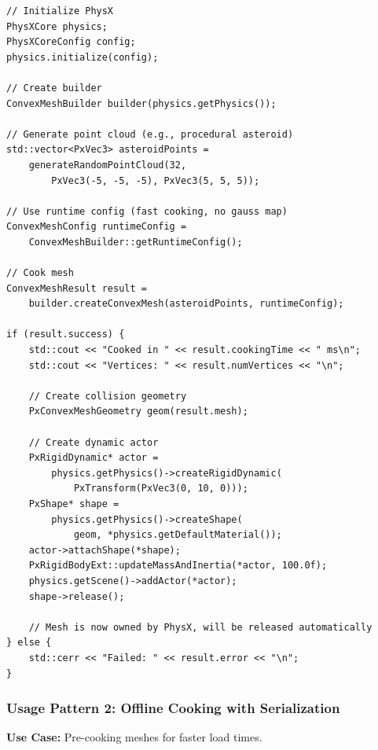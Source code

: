 \begin{lstlisting}[caption={Runtime convex mesh creation}]
// Initialize PhysX
PhysXCore physics;
PhysXCoreConfig config;
physics.initialize(config);

// Create builder
ConvexMeshBuilder builder(physics.getPhysics());

// Generate point cloud (e.g., procedural asteroid)
std::vector<PxVec3> asteroidPoints =
    generateRandomPointCloud(32,
        PxVec3(-5, -5, -5), PxVec3(5, 5, 5));

// Use runtime config (fast cooking, no gauss map)
ConvexMeshConfig runtimeConfig =
    ConvexMeshBuilder::getRuntimeConfig();

// Cook mesh
ConvexMeshResult result =
    builder.createConvexMesh(asteroidPoints, runtimeConfig);

if (result.success) {
    std::cout << "Cooked in " << result.cookingTime << " ms\n";
    std::cout << "Vertices: " << result.numVertices << "\n";

    // Create collision geometry
    PxConvexMeshGeometry geom(result.mesh);

    // Create dynamic actor
    PxRigidDynamic* actor =
        physics.getPhysics()->createRigidDynamic(
            PxTransform(PxVec3(0, 10, 0)));
    PxShape* shape =
        physics.getPhysics()->createShape(
            geom, *physics.getDefaultMaterial());
    actor->attachShape(*shape);
    PxRigidBodyExt::updateMassAndInertia(*actor, 100.0f);
    physics.getScene()->addActor(*actor);
    shape->release();

    // Mesh is now owned by PhysX, will be released automatically
} else {
    std::cerr << "Failed: " << result.error << "\n";
}
\end{lstlisting}

\subsubsection{Usage Pattern 2: Offline Cooking with Serialization}

\textbf{Use Case:} Pre-cooking meshes for faster load times.

